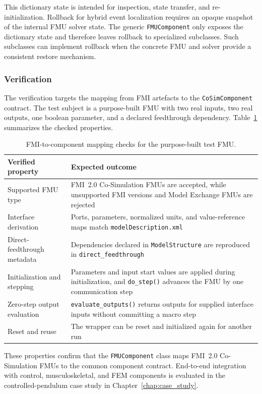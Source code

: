 This dictionary state is intended for inspection, state transfer, and re-initialization.
Rollback for hybrid event localization requires an opaque snapshot of the internal \ac{FMU} solver state.
The generic \texttt{FMUComponent} only exposes the dictionary state and therefore leaves rollback to specialized subclasses.
Such subclasses can implement rollback when the concrete \ac{FMU} and solver provide a consistent restore mechanism.

\subsubsection{Verification}

The verification targets the mapping from \ac{FMI} artefacts to the \texttt{CoSimComponent} contract.
The test subject is a purpose-built \ac{FMU} with two real inputs, two real outputs, one boolean parameter, and a declared feedthrough dependency.
Table~\ref{tab:fmu_verification} summarizes the checked properties.

\begin{table}[t]
  \centering
  \small
  \caption[\ac{FMI}-to-component mapping checks]{\ac{FMI}-to-component mapping checks for the purpose-built test \ac{FMU}.}
  \label{tab:fmu_verification}
  \begin{tabular}{p{5.8cm} p{8.8cm}}
    \toprule
    \textbf{Verified property} & \textbf{Expected outcome} \\
    \midrule
    Supported \ac{FMU} type
      & \ac{FMI}~2.0 Co-Simulation \acp{FMU} are accepted, while unsupported \ac{FMI} versions and Model Exchange \acp{FMU} are rejected \\
    \addlinespace
    Interface derivation
      & Ports, parameters, normalized units, and value-reference maps match \texttt{modelDescription.xml} \\
    \addlinespace
    Direct-feedthrough metadata
      & Dependencies declared in \texttt{ModelStructure} are reproduced in \texttt{direct\_feedthrough} \\
    \addlinespace
    Initialization and stepping
      & Parameters and input start values are applied during initialization, and \texttt{do\_step()} advances the \ac{FMU} by one communication step \\
    \addlinespace
    Zero-step output evaluation
      & \texttt{evaluate\_outputs()} returns outputs for supplied interface inputs without committing a macro step \\
    \addlinespace
    Reset and reuse
      & The wrapper can be reset and initialized again for another run \\
    \bottomrule
  \end{tabular}
\end{table}

These properties confirm that the \texttt{FMUComponent} class maps \ac{FMI}~2.0 Co-Simulation \acp{FMU} to the common component contract.
End-to-end integration with control, musculoskeletal, and \ac{FEM} components is evaluated in the controlled-pendulum case study in Chapter~\ref{chap:case_study}.
